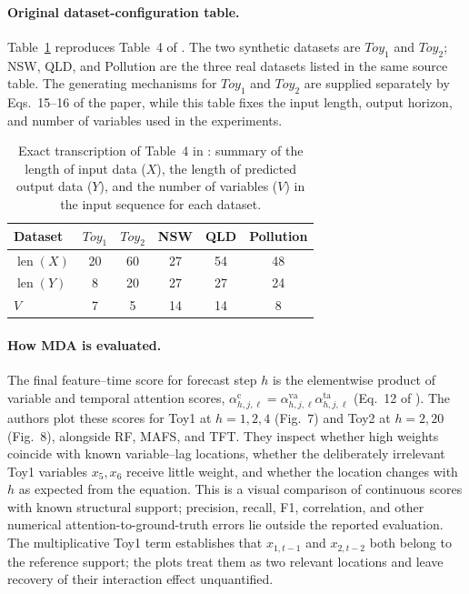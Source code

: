 \paragraph{Original dataset-configuration table.}
Table~\ref{tab:mda-dataset-settings-exact} reproduces Table~4 of
\citet{almaghrabi2024multidimensional}. The two synthetic datasets are
$Toy_1$ and $Toy_2$; NSW, QLD, and Pollution are the three real datasets listed
in the same source table. The generating mechanisms for $Toy_1$ and $Toy_2$
are supplied separately by Eqs.~15--16 of the paper, while this table fixes the
input length, output horizon, and number of variables used in the experiments.

\begin{table}[htbp]
\centering
\small
\caption{Exact transcription of Table~4 in
\citet{almaghrabi2024multidimensional}: summary of the length of input data
($X$), the length of predicted output data ($Y$), and the number of variables
($V$) in the input sequence for each dataset.}
\label{tab:mda-dataset-settings-exact}
\begin{tabular}{@{}lccccc@{}}
\toprule
Dataset & $Toy_1$ & $Toy_2$ & NSW & QLD & Pollution \\
\midrule
$\operatorname{len}(X)$ & 20 & 60 & 27 & 54 & 48 \\
$\operatorname{len}(Y)$ & 8  & 20 & 27 & 27 & 24 \\
$V$                     & 7  & 5  & 14 & 14 & 8  \\
\bottomrule
\end{tabular}
\end{table}

\paragraph{How MDA is evaluated.}
The final feature--time score for forecast step $h$ is the elementwise product
of variable and temporal attention scores,
$\alpha^{\mathrm{c}}_{h,j,\ell}
=\alpha^{\mathrm{va}}_{h,j,\ell}\alpha^{\mathrm{ta}}_{h,j,\ell}$
(Eq.~12 of \citet{almaghrabi2024multidimensional}). The authors plot these
scores for Toy1 at $h=1,2,4$ (Fig.~7) and Toy2 at $h=2,20$ (Fig.~8), alongside
RF, MAFS, and TFT. They inspect whether high weights coincide with known
variable--lag locations, whether the deliberately irrelevant Toy1 variables
$x_5,x_6$ receive little weight, and whether the location changes with $h$
as expected from the equation. This is a visual comparison of continuous
scores with known structural support; precision, recall, F1, correlation, and
other numerical attention-to-ground-truth errors lie outside the reported
evaluation. The
multiplicative Toy1 term establishes that $x_{1,t-1}$ and $x_{2,t-2}$ both
belong to the reference support; the plots treat them as two relevant locations
and leave recovery of their interaction effect unquantified.

